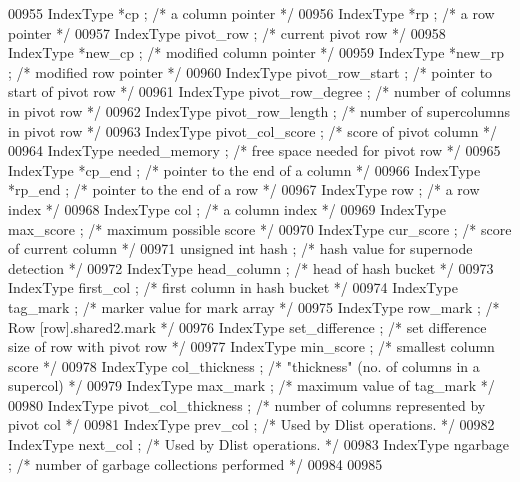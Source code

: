 \begin{DoxyCode}
{{{{{{{{{{{{{{{{{00955   IndexType *cp ;     \textcolor{comment}{/* a column pointer */}
00956   IndexType *rp ;     \textcolor{comment}{/* a row pointer */}
00957   IndexType pivot\_row ;   \textcolor{comment}{/* current pivot row */}
00958   IndexType *new\_cp ;   \textcolor{comment}{/* modified column pointer */}
00959   IndexType *new\_rp ;   \textcolor{comment}{/* modified row pointer */}
00960   IndexType pivot\_row\_start ; \textcolor{comment}{/* pointer to start of pivot row */}
00961   IndexType pivot\_row\_degree ;  \textcolor{comment}{/* number of columns in pivot row */}
00962   IndexType pivot\_row\_length ;  \textcolor{comment}{/* number of supercolumns in pivot row */}
00963   IndexType pivot\_col\_score ; \textcolor{comment}{/* score of pivot column */}
00964   IndexType needed\_memory ;   \textcolor{comment}{/* free space needed for pivot row */}
00965   IndexType *cp\_end ;   \textcolor{comment}{/* pointer to the end of a column */}
00966   IndexType *rp\_end ;   \textcolor{comment}{/* pointer to the end of a row */}
00967   IndexType row ;     \textcolor{comment}{/* a row index */}
00968   IndexType col ;     \textcolor{comment}{/* a column index */}
00969   IndexType max\_score ;   \textcolor{comment}{/* maximum possible score */}
00970   IndexType cur\_score ;   \textcolor{comment}{/* score of current column */}
00971   \textcolor{keywordtype}{unsigned} \textcolor{keywordtype}{int} hash ;   \textcolor{comment}{/* hash value for supernode detection */}
00972   IndexType head\_column ;   \textcolor{comment}{/* head of hash bucket */}
00973   IndexType first\_col ;   \textcolor{comment}{/* first column in hash bucket */}
00974   IndexType tag\_mark ;    \textcolor{comment}{/* marker value for mark array */}
00975   IndexType row\_mark ;    \textcolor{comment}{/* Row [row].shared2.mark */}
00976   IndexType set\_difference ;  \textcolor{comment}{/* set difference size of row with pivot row */}
00977   IndexType min\_score ;   \textcolor{comment}{/* smallest column score */}
00978   IndexType col\_thickness ;   \textcolor{comment}{/* "thickness" (no. of columns in a supercol) */}
00979   IndexType max\_mark ;    \textcolor{comment}{/* maximum value of tag\_mark */}
00980   IndexType pivot\_col\_thickness ; \textcolor{comment}{/* number of columns represented by pivot col */}
00981   IndexType prev\_col ;    \textcolor{comment}{/* Used by Dlist operations. */}
00982   IndexType next\_col ;    \textcolor{comment}{/* Used by Dlist operations. */}
00983   IndexType ngarbage ;    \textcolor{comment}{/* number of garbage collections performed */}
00984 
00985 
}}}}}}}}}}}}}}}}}
\end{DoxyCode}
